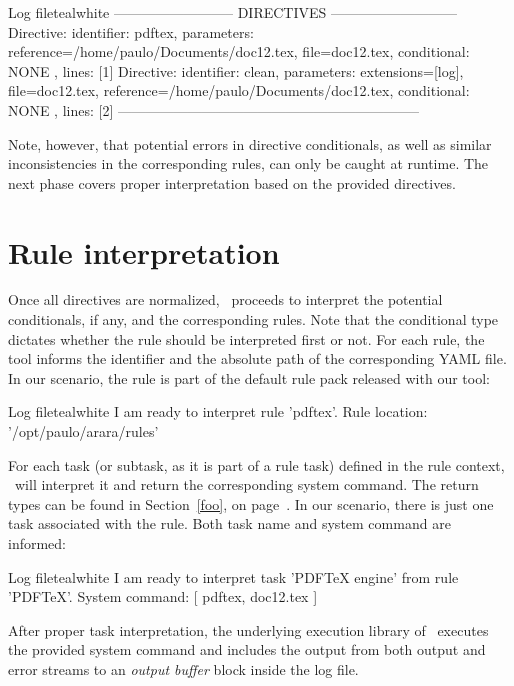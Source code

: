\begin{codebox}{Log file}{teal}{\icnote}{white}
-------------------------- DIRECTIVES ---------------------------
Directive: { identifier: pdftex, parameters:
{reference=/home/paulo/Documents/doc12.tex,
file=doc12.tex}, conditional: { NONE }, lines: [1] }
Directive: { identifier: clean, parameters: {extensions=[log],
file=doc12.tex, reference=/home/paulo/Documents/doc12.tex},
conditional: { NONE }, lines: [2] }
-----------------------------------------------------------------
\end{codebox}

Note, however, that potential errors in directive conditionals, as well as similar inconsistencies in the corresponding rules, can only be caught at runtime. The next phase covers proper interpretation based on the provided directives.

\section{Rule interpretation}
\label{sec:ruleinterpretation}

Once all directives are normalized, \arara\ proceeds to interpret the potential conditionals, if any, and the corresponding rules. Note that the conditional type dictates whether the rule should be interpreted first or not. For each rule, the tool informs the identifier and the absolute path of the corresponding YAML file. In our scenario, the rule is part of the default rule pack released with our tool:

\begin{codebox}{Log file}{teal}{\icnote}{white}
I am ready to interpret rule 'pdftex'.
Rule location: '/opt/paulo/arara/rules'
\end{codebox}

For each task (or subtask, as it is part of a rule task) defined in the rule context, \arara\ will interpret it and return the corresponding system command. The return types can be found in Section~\ref{foo}, on page~\pageref{foo}. In our scenario, there is just one task associated with the  rule. Both task name and system command are informed:

\begin{codebox}{Log file}{teal}{\icnote}{white}
I am ready to interpret task 'PDFTeX engine' from rule 'PDFTeX'.
System command: [ pdftex, doc12.tex ]
\end{codebox}

After proper task interpretation, the underlying execution library of \arara\ executes the provided system command and includes the output from both output and error streams to an \emph{output buffer} block inside the log file.

